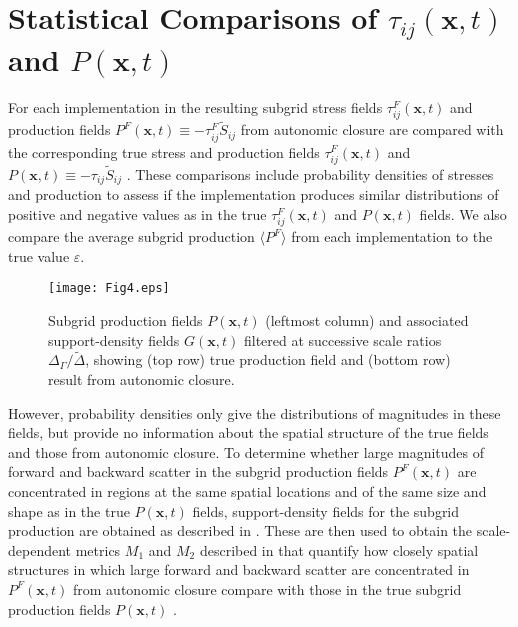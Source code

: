 \section{Statistical Comparisons of $\tau_{ij}(\mathbf{x},t)$  and  $P(\mathbf{x},t)$ } 
\label{sec:IIIB}

For each implementation in  the resulting subgrid stress fields  $\tau_{ij}^{F}(\mathbf{x},t)$   and production fields $P^{F}(\mathbf{x},t) \equiv -\tau_{ij}^{F} \widetilde{S}_{ij}$ from autonomic closure are compared with the corresponding true stress and production fields  $\tau_{ij}^{F}(\mathbf{x},t)$  and $P(\mathbf{x},t) \equiv -\tau_{ij} \widetilde{S}_{ij}$  . These comparisons include probability densities of stresses and production to assess if the implementation produces similar distributions of positive and negative values as in the true $\tau_{ij}^{F}(\mathbf{x},t)$  and  $P(\mathbf{x},t)$ fields. We also compare the average subgrid production $\langle P^F \rangle$  from each implementation to the true value $\varepsilon$.

%
\begin{figure}
	\begin{center}
	\texttt{[image: Fig4.eps]}
	\caption{ Subgrid production fields $P(\mathbf{x},t)$ (leftmost column) and associated support-density fields $G(\mathbf{x},t)$ filtered at successive scale ratios $\Delta_{\Gamma}/\widetilde{\Delta}$, showing (top row) true production field and (bottom row) result from autonomic closure. }
	\label{F:4}
	\end{center}
\end{figure}
%
%
However, probability densities only give the distributions of magnitudes in these fields, but provide no information about the spatial structure of the true fields and those from autonomic closure. To determine whether large magnitudes of forward and backward scatter in the subgrid production fields $P^{F}(\mathbf{x},t)$  are concentrated in regions at the same spatial locations and of the same size and shape as in the true $P(\mathbf{x},t)$  fields, support-density fields for the subgrid production are obtained as described in . These are then used to obtain the scale-dependent metrics $M_1$  and $M_2$  described in  that quantify how closely spatial structures in which large forward and backward scatter are concentrated in $P^{F}(\mathbf{x},t)$  from autonomic closure compare with those in the true subgrid production fields $P(\mathbf{x},t)$ .


